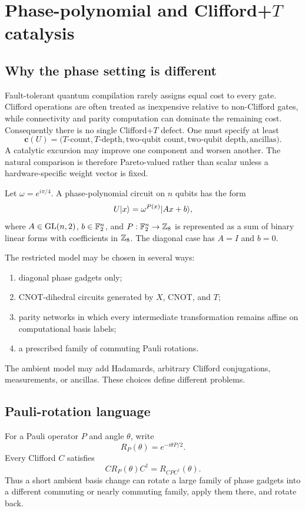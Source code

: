 \chapter{Phase-polynomial and Clifford+\texorpdfstring{$T$}{T} catalysis}\label{ch:phase-cliffordt}


\section{Why the phase setting is different}
Fault-tolerant quantum compilation rarely assigns equal cost to every gate.  Clifford operations are often treated as inexpensive relative to non-Clifford gates, while connectivity and parity computation can dominate the remaining cost.  Consequently there is no single Clifford+$T$ defect.  One must specify at least
\[
\mathbf c(U)=
\bigl(
T\text{-count},
T\text{-depth},
\text{two-qubit count},
\text{two-qubit depth},
\text{ancillas}
\bigr).
\]
A catalytic excursion may improve one component and worsen another.  The natural comparison is therefore Pareto-valued rather than scalar unless a hardware-specific weight vector is fixed.

Let $\omega=e^{i\pi/4}$.  A phase-polynomial circuit on $n$ qubits has the form \cite{AmyMosca2019,Selinger2013}
\begin{equation}\label{eq:phase-poly-normal}
U\lvert x\rangle=\omega^{P(x)}\lvert Ax+b\rangle,
\end{equation}
where $A\in\operatorname{GL}(n,2)$, $b\in\mathbb F_2^n$, and $P:\mathbb F_2^n\to\mathbb Z_8$ is represented as a sum of binary linear forms with coefficients in $\mathbb Z_8$.  The diagonal case has $A=I$ and $b=0$.

The restricted model may be chosen in several ways:
\begin{enumerate}
\item diagonal phase gadgets only;
\item CNOT-dihedral circuits generated by $X$, CNOT, and $T$;
\item parity networks in which every intermediate transformation remains affine on computational basis labels;
\item a prescribed family of commuting Pauli rotations.
\end{enumerate}
The ambient model may add Hadamards, arbitrary Clifford conjugations, measurements, or ancillas.  These choices define different problems.

\section{Pauli-rotation language}
For a Pauli operator $P$ and angle $\theta$, write
\[
R_P(\theta)=e^{-i\theta P/2}.
\]
Every Clifford $C$ satisfies
\begin{equation}\label{eq:pauli-conjugation}
C R_P(\theta) C^\dagger=R_{CPC^\dagger}(\theta).
\end{equation}
Thus a short ambient basis change can rotate a large family of phase gadgets into a different commuting or nearly commuting family, apply them there, and rotate back.

